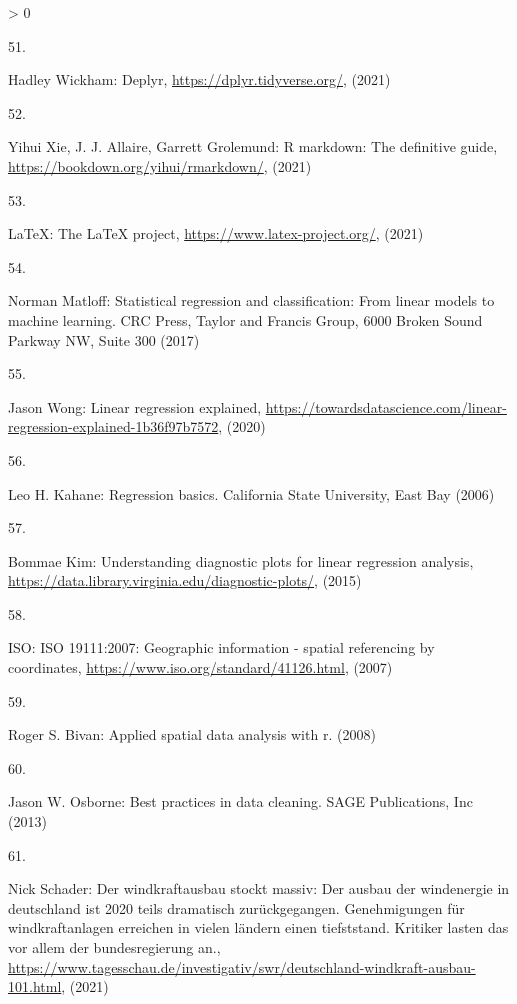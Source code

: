 \documentclass[a4paper,11pt]{article}
\newlength{\cslhangindent}
\newlength{\csllabelwidth}
\newenvironment{CSLReferences}[3] %
 {%
  \setlength{\parindent}{0pt}
  \ifodd #1 \everypar{\setlength{\hangindent}{\cslhangindent}}\ignorespaces\fi
  \ifnum #2 > 0
  \setlength{\parskip}{#2\baselineskip}
  \fi
 }%
 {}
\newcommand{\CSLLeftMargin}[1]{\parbox[t]{\maxof{\widthof{#1}}{\csllabelwidth}}{#1}}
\newcommand{\CSLRightInline}[1]{\parbox[t]{\linewidth}{#1}}
\begin{document}
\begin{CSLReferences}{0}{0}
\leavevmode\hypertarget{ref-HadleyWickham.2021}{}%
\CSLLeftMargin{51. }
\CSLRightInline{Hadley Wickham: Deplyr, \url{https://dplyr.tidyverse.org/}, (2021)}

\leavevmode\hypertarget{ref-YihuiXieJ.J.AllaireGarrettGrolemund.2021}{}%
\CSLLeftMargin{52. }
\CSLRightInline{Yihui Xie, J. J. Allaire, Garrett Grolemund: R markdown: The definitive guide, \url{https://bookdown.org/yihui/rmarkdown/}, (2021)}

\leavevmode\hypertarget{ref-LaTeX.2021}{}%
\CSLLeftMargin{53. }
\CSLRightInline{LaTeX: The LaTeX project, \url{https://www.latex-project.org/}, (2021)}

\leavevmode\hypertarget{ref-NormanMatloff.2017}{}%
\CSLLeftMargin{54. }
\CSLRightInline{Norman Matloff: Statistical regression and classification: From linear models to machine learning. {CRC Press, Taylor and Francis Group}, 6000 Broken Sound Parkway NW, Suite 300 (2017)}

\leavevmode\hypertarget{ref-JasonWong.2020}{}%
\CSLLeftMargin{55. }
\CSLRightInline{Jason Wong: Linear regression explained, \url{https://towardsdatascience.com/linear-regression-explained-1b36f97b7572}, (2020)}

\leavevmode\hypertarget{ref-LeoH.Kahane.2006}{}%
\CSLLeftMargin{56. }
\CSLRightInline{Leo H. Kahane: Regression basics. {California State University, East Bay} (2006)}

\leavevmode\hypertarget{ref-BommaeKim.2015}{}%
\CSLLeftMargin{57. }
\CSLRightInline{Bommae Kim: Understanding diagnostic plots for linear regression analysis, \url{https://data.library.virginia.edu/diagnostic-plots/}, (2015)}

\leavevmode\hypertarget{ref-ISO.2007}{}%
\CSLLeftMargin{58. }
\CSLRightInline{ISO: ISO 19111:2007: Geographic information - spatial referencing by coordinates, \url{https://www.iso.org/standard/41126.html}, (2007)}

\leavevmode\hypertarget{ref-RogerS.Bivan.2008}{}%
\CSLLeftMargin{59. }
\CSLRightInline{Roger S. Bivan: Applied spatial data analysis with r. (2008)}

\leavevmode\hypertarget{ref-JasonW.Osborne.2013}{}%
\CSLLeftMargin{60. }
\CSLRightInline{Jason W. Osborne: Best practices in data cleaning. {SAGE Publications, Inc} (2013)}

\leavevmode\hypertarget{ref-NickSchader.2021}{}%
\CSLLeftMargin{61. }
\CSLRightInline{Nick Schader: Der windkraftausbau stockt massiv: Der ausbau der windenergie in deutschland ist 2020 teils dramatisch zur{ü}ckgegangen. Genehmigungen f{ü}r windkraftanlagen erreichen in vielen l{ä}ndern einen tiefststand. Kritiker lasten das vor allem der bundesregierung an., \url{https://www.tagesschau.de/investigativ/swr/deutschland-windkraft-ausbau-101.html}, (2021)}


\end{CSLReferences}
\end{document}

